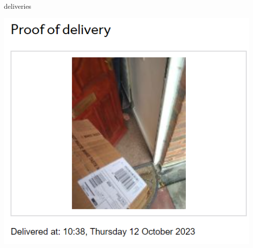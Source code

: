 \documentclass{minimal}
\begin{document}
\pagestyle{empty}%
\vspace*{\fill}
\centering
deliveries
\vspace*{\fill}
\pagebreak



\pagebreak
\vspace*{\fill}
\centering
\includegraphics[height=0.75\textheight]{Screenshot_2023-10-12_111150.png}
\vspace*{\fill}
\pagebreak
\end{document}
